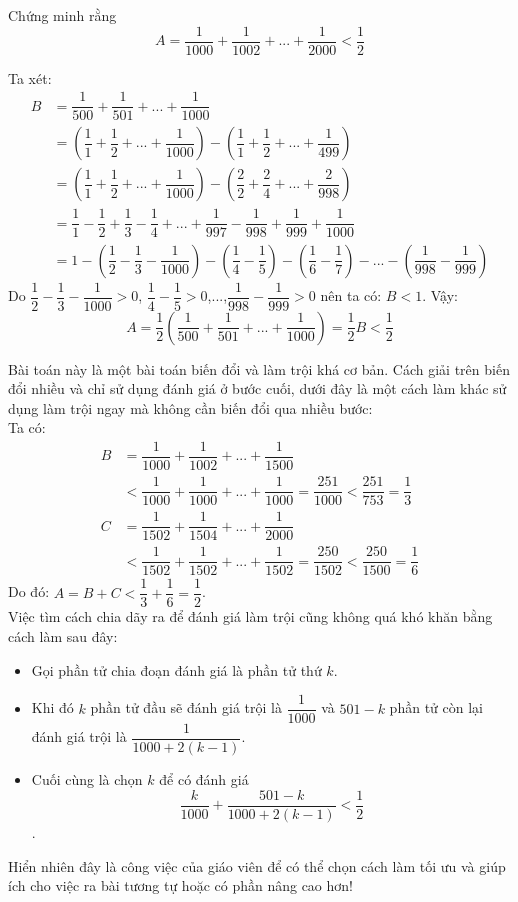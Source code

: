\begin{bt}%
	Chứng minh rằng  $$A=\dfrac{1}{1000}+\dfrac{1}{1002}+...+\dfrac{1}{2000}<\dfrac{1}{2}$$
	\loigiai
	{Ta xét:
		{\allowdisplaybreaks
			\begin{align*}
				B&=\dfrac{1}{500}+\dfrac{1}{501}+...+\dfrac{1}{1000}\\
				&=\left(\dfrac{1}{1}+\dfrac{1}{2}+...+\dfrac{1}{1000}\right)-\left(\dfrac{1}{1}+\dfrac{1}{2}+...+\dfrac{1}{499}\right)\\
				&=\left(\dfrac{1}{1}+\dfrac{1}{2}+...+\dfrac{1}{1000}\right)-\left(\dfrac{2}{2}+\dfrac{2}{4}+...+\dfrac{2}{998}\right)\\
				&=\dfrac{1}{1}-\dfrac{1}{2}+\dfrac{1}{3}-\dfrac{1}{4}+...+\dfrac{1}{997}-\dfrac{1}{998}+\dfrac{1}{999}+\dfrac{1}{1000}\\
				&=1-\left(\dfrac{1}{2}-\dfrac{1}{3}-\dfrac{1}{1000}\right)-\left(\dfrac{1}{4}-\dfrac{1}{5}\right)-\left(\dfrac{1}{6}-\dfrac{1}{7}\right)-...-\left(\dfrac{1}{998}-\dfrac{1}{999}\right)
		\end{align*}}
		Do $\dfrac{1}{2}-\dfrac{1}{3}-\dfrac{1}{1000}>0$, $\dfrac{1}{4}-\dfrac{1}{5}>0$,...,$\dfrac{1}{998}-\dfrac{1}{999}>0$ nên ta có: $B<1$.
		Vậy: $$A=\dfrac{1}{2}\left(\dfrac{1}{500}+\dfrac{1}{501}+...+\dfrac{1}{1000}\right)=\dfrac{1}{2}B<\dfrac{1}{2}$$
		\begin{nx}
			Bài toán này là một bài toán biến đổi và làm trội khá cơ bản. Cách giải trên biến đổi nhiều và chỉ sử dụng đánh giá ở bước cuối, dưới đây là một cách làm khác sử dụng làm trội ngay mà không cần biến đổi qua nhiều bước:\\
			Ta có:
			{\allowdisplaybreaks
				\begin{align*}
					B&=\dfrac{1}{1000}+\dfrac{1}{1002}+...+\dfrac{1}{1500}\\
					&<\dfrac{1}{1000}+\dfrac{1}{1000}+...+\dfrac{1}{1000}=\dfrac{251}{1000}<
					\dfrac{251}{753}=\dfrac{1}{3}\\
					C&=\dfrac{1}{1502}+\dfrac{1}{1504}+...+\dfrac{1}{2000}\\
					&<\dfrac{1}{1502}+\dfrac{1}{1502}+...+\dfrac{1}{1502}=\dfrac{250}{1502}<\dfrac{250}{1500}=\dfrac{1}{6}
			\end{align*}}
			Do đó: $A=B+C<\dfrac{1}{3}+\dfrac{1}{6}=\dfrac{1}{2}$.\\
			Việc tìm cách chia dãy ra để đánh giá làm trội cũng không quá khó khăn bằng cách làm sau đây:
			\begin{itemize}
				\item Gọi phần tử chia đoạn đánh giá là phần tử thứ $k$.
				\item Khi đó $k$ phần tử đầu sẽ đánh giá trội là $\dfrac{1}{1000}$ và $501-k$ phần tử còn lại đánh giá trội là $\dfrac{1}{1000+2(k-1)}$.
				\item Cuối cùng là chọn $k$ để có đánh giá $$\dfrac{k}{1000}+\dfrac{501-k}{1000+2(k-1)}<\dfrac{1}{2}$$.
			\end{itemize}
			Hiển nhiên đây là công việc của giáo viên để có thể chọn cách làm tối ưu và giúp ích cho việc ra bài tương tự hoặc có phần nâng cao hơn! 
		\end{nx}
	}
\end{bt}

